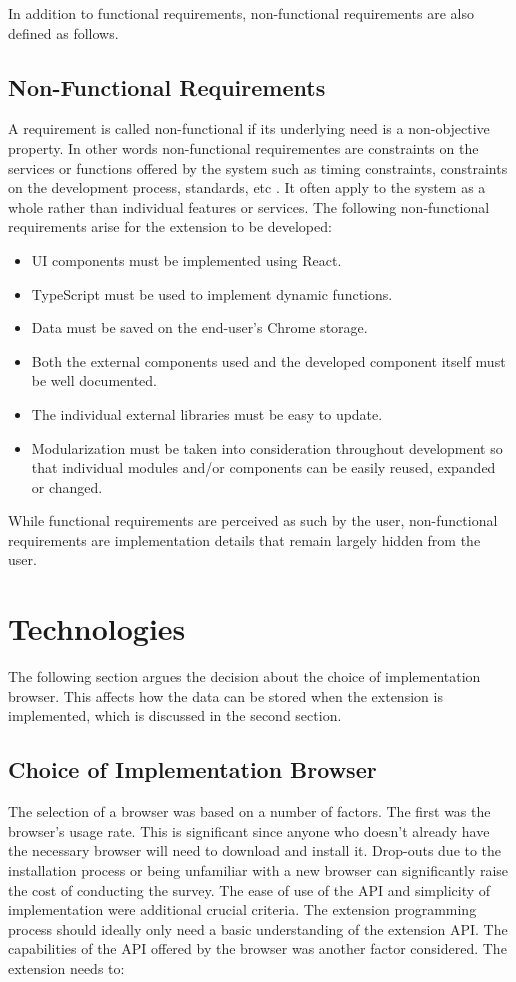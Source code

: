 In addition to functional requirements, non-functional requirements are also defined as follows.

\subsection{Non-Functional Requirements}
A requirement is called non-functional if its underlying need is a non-objective property. In other words non-functional requirementes are constraints on the services or functions offered by the system such as timing constraints, constraints on the development process, standards, etc \autocite{sommerville2011software}. It often apply to the system as a whole rather than individual features or services. The following non-functional requirements arise for the extension to be developed:

\begin{itemize}
  \item UI components must be implemented using React.
  \item TypeScript must be used to implement dynamic functions.
  \item Data must be saved on the end-user's Chrome storage.
  \item Both the external components used and the developed component itself must be well documented.
  \item The individual external libraries must be easy to update.
  \item Modularization must be taken into consideration throughout development so that individual modules and/or components can be easily reused, expanded or changed.
\end{itemize}

While functional requirements are perceived as such by the user, non-functional requirements are implementation details that remain largely hidden from the user.

\section{Technologies}
\label{technologies_used}
The following section argues the decision about the choice of implementation browser. This affects how the data can be stored when the extension is implemented, which is discussed in the second section.

\subsection{Choice of Implementation Browser}
The selection of a browser was based on a number of factors. The first was the browser's usage rate. This is significant since anyone who doesn't already have the necessary browser will need to download and install it. Drop-outs due to the installation process or being unfamiliar with a new browser can significantly raise the cost of conducting the survey. The ease of use of the API and simplicity of implementation were additional crucial criteria. The extension programming process should ideally only need a basic understanding of the extension API. The capabilities of the API offered by the browser was another factor considered. The extension needs to:

